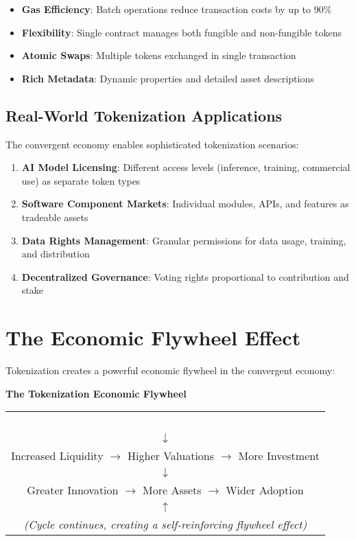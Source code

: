 \documentclass[11pt,a4paper]{report}
\begin{document}
\begin{keypoint}
\begin{itemize}
    \item \textbf{Gas Efficiency}: Batch operations reduce transaction costs by up to 90\%
    \item \textbf{Flexibility}: Single contract manages both fungible and non-fungible tokens
    \item \textbf{Atomic Swaps}: Multiple tokens exchanged in single transaction
    \item \textbf{Rich Metadata}: Dynamic properties and detailed asset descriptions
\end{itemize}
\end{keypoint}

\subsection{Real-World Tokenization Applications}

The convergent economy enables sophisticated tokenization scenarios:

\begin{enumerate}
    \item \textbf{AI Model Licensing}: Different access levels (inference, training, commercial use) as separate token types
    \item \textbf{Software Component Markets}: Individual modules, APIs, and features as tradeable assets
    \item \textbf{Data Rights Management}: Granular permissions for data usage, training, and distribution
    \item \textbf{Decentralized Governance}: Voting rights proportional to contribution and stake
\end{enumerate}

\section{The Economic Flywheel Effect}

Tokenization creates a powerful economic flywheel in the convergent economy:

\vspace{0.5cm}

\begin{center}
\textbf{The Tokenization Economic Flywheel}

\vspace{0.3cm}

\begin{tabular}{c}
\colorbox{ocean}{\textcolor{white}{\textbf{Tokenized Assets}}} \\
$\downarrow$ \\
Increased Liquidity $\rightarrow$ Higher Valuations $\rightarrow$ More Investment \\
$\downarrow$ \\
Greater Innovation $\rightarrow$ More Assets $\rightarrow$ Wider Adoption \\
$\uparrow$ \\
\textit{(Cycle continues, creating a self-reinforcing flywheel effect)}
\end{tabular}
\end{center}
\end{document}

